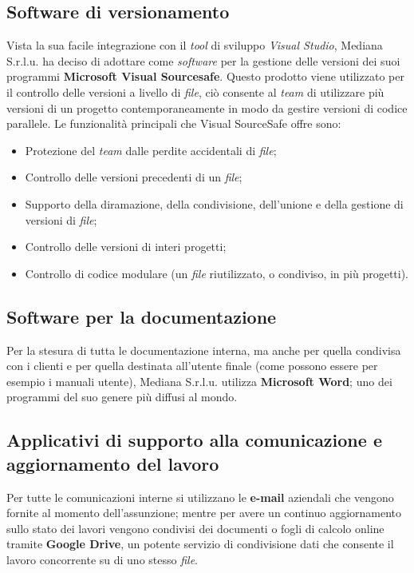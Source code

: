 \subsection{Software di versionamento}
\label{sw verionamento}
Vista la sua facile integrazione con il \textit{tool} di sviluppo \textit{Visual Studio}, Mediana S.r.l.u. ha deciso di adottare come \textit{software} per la gestione delle versioni dei suoi programmi \textbf{Microsoft Visual Sourcesafe}. Questo prodotto viene utilizzato per il controllo delle versioni a livello di \textit{file}, ciò consente al \textit{team} di utilizzare più versioni di un progetto contemporaneamente in modo da gestire versioni di codice parallele. Le funzionalità principali che Visual SourceSafe offre sono:
\begin{itemize}
\item Protezione del \textit{team} dalle perdite accidentali di \textit{file};
\item Controllo delle versioni precedenti di un \textit{file};
\item Supporto della diramazione, della condivisione, dell'unione e della gestione di versioni di \textit{file};
\item Controllo delle versioni di interi progetti;
\item Controllo di codice modulare (un \textit{file} riutilizzato, o condiviso, in più progetti).
\end{itemize}

\subsection{Software per la documentazione}
\label{sw documentazione}
Per la stesura di tutta le documentazione interna, ma anche per quella condivisa con i clienti e per quella destinata all'utente finale (come possono essere per esempio i manuali utente), Mediana S.r.l.u. utilizza \textbf{Microsoft Word}; uno dei programmi del suo genere più diffusi al mondo.

\subsection{Applicativi di supporto alla comunicazione e aggiornamento del lavoro}
\label{sw comunicazione}
Per tutte le comunicazioni interne si utilizzano le \textbf{e-mail} aziendali che vengono fornite al momento dell'assunzione; mentre per avere un continuo aggiornamento sullo stato dei lavori vengono condivisi dei documenti o fogli di calcolo online tramite \textbf{Google Drive}, un potente servizio di condivisione dati che consente il lavoro concorrente su di uno stesso \textit{file}.